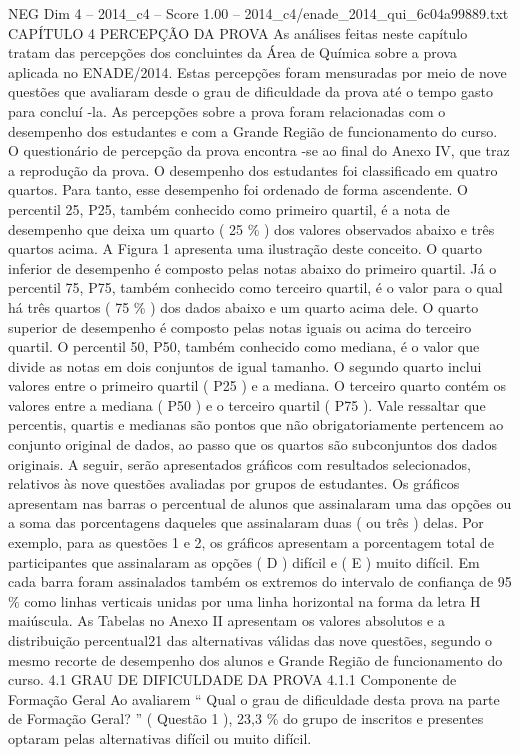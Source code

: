 \begin{textsample}{NEG Dim 4 – 2014\_c4 – Score 1.00 – 2014\_c4/enade\_2014\_qui\_6c04a99889.txt}  \label{ex:f4_neg_157}
CAPÍTULO 4 PERCEPÇÃO DA PROVA As análises feitas neste capítulo tratam das percepções dos concluintes da Área de Química sobre a prova aplicada no ENADE/2014.
Estas percepções foram mensuradas por meio de nove questões que avaliaram desde o grau de dificuldade da prova até o tempo gasto para concluí -la.
As percepções sobre a prova foram relacionadas com o desempenho dos estudantes e com a Grande Região de funcionamento do curso.
O questionário de percepção da prova encontra -se ao final do Anexo IV, que traz a reprodução da prova.
O desempenho dos estudantes foi classificado em quatro quartos.
Para tanto, esse desempenho foi ordenado de forma ascendente.
O percentil 25, P25, também conhecido como primeiro quartil, é a nota de desempenho que deixa um quarto ( 25 \% ) dos valores observados abaixo e três quartos acima.
A Figura 1 apresenta uma ilustração deste conceito.
O quarto inferior de desempenho é composto pelas notas abaixo do primeiro quartil.
Já o percentil 75, P75, também conhecido como terceiro quartil, é o valor para o qual há três quartos ( 75 \% ) dos dados abaixo e um quarto acima dele.
O quarto superior de desempenho é composto pelas notas iguais ou acima do terceiro quartil.
O percentil 50, P50, também conhecido como mediana, é o valor que divide as notas em dois conjuntos de igual tamanho.
O segundo quarto inclui valores entre o primeiro quartil ( P25 ) e a mediana.
O terceiro quarto contém os valores entre a mediana ( P50 ) e o terceiro quartil ( P75 ).
Vale ressaltar que percentis, quartis e medianas são pontos que não obrigatoriamente pertencem ao conjunto original de dados, ao passo que os quartos são subconjuntos dos dados originais.
A seguir, serão apresentados gráficos com resultados selecionados, relativos às nove questões avaliadas por grupos de estudantes.
Os gráficos apresentam nas barras o percentual de alunos que assinalaram uma das opções ou a soma das porcentagens daqueles que assinalaram duas ( ou três ) delas.
Por exemplo, para as questões 1 e 2, os gráficos apresentam a porcentagem total de participantes que assinalaram as opções ( D ) difícil e ( E ) muito difícil.
Em cada barra foram assinalados também os extremos do intervalo de confiança de 95 \% como linhas verticais unidas por uma linha horizontal na forma da letra H maiúscula.
As Tabelas no Anexo II apresentam os valores absolutos e a distribuição percentual21 das alternativas válidas das nove questões, segundo o mesmo recorte de desempenho dos alunos e Grande Região de funcionamento do curso. 4.1 GRAU DE DIFICULDADE DA PROVA 4.1.1 Componente de Formação Geral Ao avaliarem “ Qual o grau de dificuldade desta prova na parte de Formação Geral? ” ( Questão 1 ), 23,3 \% do grupo de inscritos e presentes optaram pelas alternativas difícil ou muito difícil.

\end{textsample}
